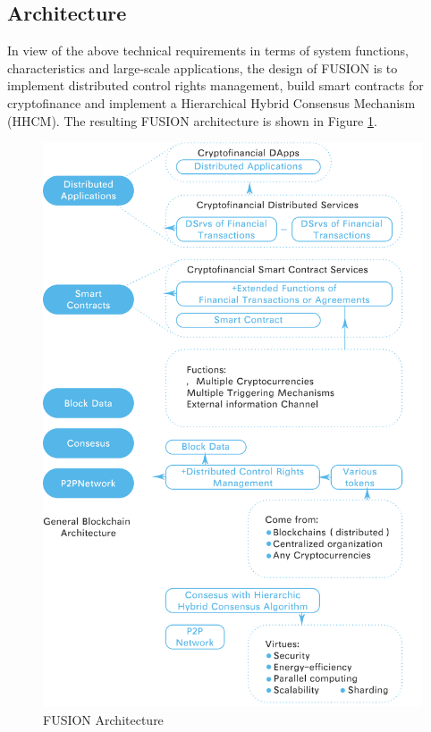\documentclass[a4paper,12pt]{article}
\begin{document}
\subsection{Architecture}

In view of the above technical requirements in terms of system functions, characteristics and large-scale applications, the design of FUSION is to implement distributed control rights management, build smart contracts for cryptofinance and implement a Hierarchical Hybrid Consensus Mechanism (HHCM). The resulting FUSION architecture is shown in Figure \ref{fig: Architecture}.

\begin{figure} [htbp]
\centering \includegraphics [width = \linewidth]{pic/Architecture.png}
\caption{FUSION Architecture} \label{fig: Architecture}
\end{figure}
\end{document}

